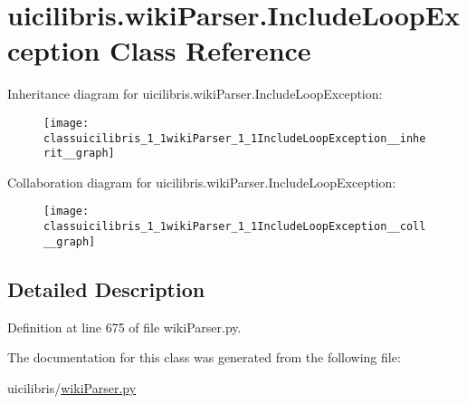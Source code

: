 \hypertarget{classuicilibris_1_1wikiParser_1_1IncludeLoopException}{\section{uicilibris.\-wiki\-Parser.\-Include\-Loop\-Exception \-Class \-Reference}
\label{classuicilibris_1_1wikiParser_1_1IncludeLoopException}
}


\-Inheritance diagram for uicilibris.\-wiki\-Parser.\-Include\-Loop\-Exception\-:
\nopagebreak
\begin{figure}[H]
\begin{center}
\leavevmode
\texttt{[image: classuicilibris\_1\_1wikiParser\_1\_1IncludeLoopException\_\_inherit\_\_graph]}
\end{center}
\end{figure}


\-Collaboration diagram for uicilibris.\-wiki\-Parser.\-Include\-Loop\-Exception\-:
\nopagebreak
\begin{figure}[H]
\begin{center}
\leavevmode
\texttt{[image: classuicilibris\_1\_1wikiParser\_1\_1IncludeLoopException\_\_coll\_\_graph]}
\end{center}
\end{figure}


\subsection{\-Detailed \-Description}


\-Definition at line 675 of file wiki\-Parser.\-py.



\-The documentation for this class was generated from the following file\-:\begin{DoxyCompactItemize}
\item 
uicilibris/\hyperlink{wikiParser_8py}{wiki\-Parser.\-py}\end{DoxyCompactItemize}
